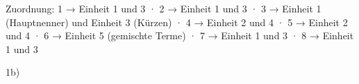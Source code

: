 
Zuordnung: 1 → Einheit 1 und 3 · 2 → Einheit 1 und 3 · 3 → Einheit 1 (Hauptnenner) und Einheit 3 (Kürzen) · 4 → Einheit 2 und 4 · 5 → Einheit 2 und 4 · 6 → Einheit 5 (gemischte Terme) · 7 → Einheit 1 und 3 · 8 → Einheit 1 und 3


1b)


